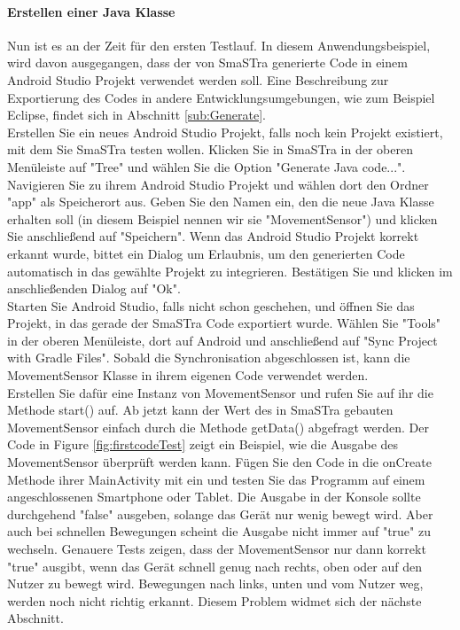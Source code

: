 \paragraph{Erstellen einer Java Klasse}
Nun ist es an der Zeit f\"ur den ersten Testlauf. In diesem Anwendungsbeispiel, wird davon ausgegangen, dass der von SmaSTra generierte Code in einem Android Studio
Projekt verwendet werden soll. Eine Beschreibung zur Exportierung des Codes in andere Entwicklungsumgebungen, wie zum Beispiel Eclipse, findet sich in Abschnitt \ref{sub:Generate}.
\\
Erstellen Sie ein neues Android Studio Projekt, falls noch kein Projekt existiert, mit dem Sie SmaSTra testen wollen. Klicken Sie in SmaSTra in der oberen Men\"uleiste auf "Tree" und w\"ahlen Sie die Option "Generate Java code...". Navigieren Sie zu ihrem Android Studio Projekt und w\"ahlen dort den Ordner "app" als Speicherort aus. Geben Sie den Namen ein, den die neue Java Klasse erhalten soll (in diesem Beispiel nennen wir sie "MovementSensor") und klicken Sie anschlie{\ss}end auf "Speichern". Wenn das Android Studio Projekt korrekt erkannt wurde, bittet ein Dialog um Erlaubnis, um den generierten Code automatisch in das gew\"ahlte Projekt zu integrieren. Best\"atigen Sie und klicken im anschlie{\ss}enden Dialog auf "Ok".
\\
Starten Sie Android Studio, falls nicht schon geschehen, und \"offnen Sie das Projekt, in das gerade der SmaSTra Code exportiert wurde. W\"ahlen Sie "Tools" in der oberen Men\"uleiste, dort auf Android und anschlie{\ss}end auf "Sync Project with Gradle Files". Sobald die Synchronisation abgeschlossen ist, kann die MovementSensor Klasse in ihrem eigenen Code verwendet werden. 
\\
Erstellen Sie daf\"ur eine Instanz von MovementSensor und rufen Sie auf ihr die Methode start() auf. Ab jetzt kann der Wert des in SmaSTra gebauten MovementSensor einfach durch die Methode getData() abgefragt werden. Der Code in Figure \ref{fig:firstcodeTest} zeigt ein Beispiel, wie die Ausgabe des MovementSensor \"uberpr\"uft werden kann. 
F\"ugen Sie den Code in die onCreate Methode ihrer MainActivity mit ein und testen Sie das Programm auf einem angeschlossenen Smartphone oder Tablet. Die Ausgabe in der Konsole sollte durchgehend "false" ausgeben, solange das Ger\"at nur wenig bewegt wird. Aber auch bei schnellen Bewegungen scheint die Ausgabe nicht immer auf "true" zu wechseln. Genauere Tests zeigen, dass der MovementSensor nur dann korrekt "true" ausgibt, wenn das Ger\"at schnell genug nach rechts, oben oder auf den Nutzer zu bewegt wird. Bewegungen nach links, unten und vom Nutzer weg, werden noch nicht richtig erkannt. Diesem Problem widmet sich der n\"achste Abschnitt.
\\

